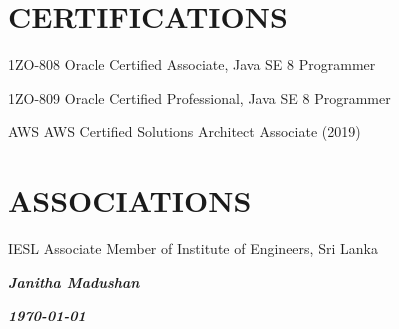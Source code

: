 \documentclass[]{cv-class}
\begin{document}
\section{CERTIFICATIONS}
\begin{entrylist}
\entry
    {}
	{1ZO-808}
    {}
	{Oracle Certified Associate, Java SE 8 Programmer}

\entry
    {}
	{1ZO-809}
    {}
	{Oracle Certified Professional, Java SE 8 Programmer}

\entry
    {}
	{AWS}
    {}
	{AWS Certified Solutions Architect Associate (2019)}
\end{entrylist}


\section{ASSOCIATIONS}
\begin{entrylist}
\entry
    {}
	{IESL}    
    {}
	{Associate Member of Institute of Engineers, Sri Lanka}
\end{entrylist}

\begin{flushright}
\emph{\textbf{Janitha Madushan}}
\end{flushright}
\begin{flushright}
\emph{\textbf{\today}}
\end{flushright}
\end{document}
